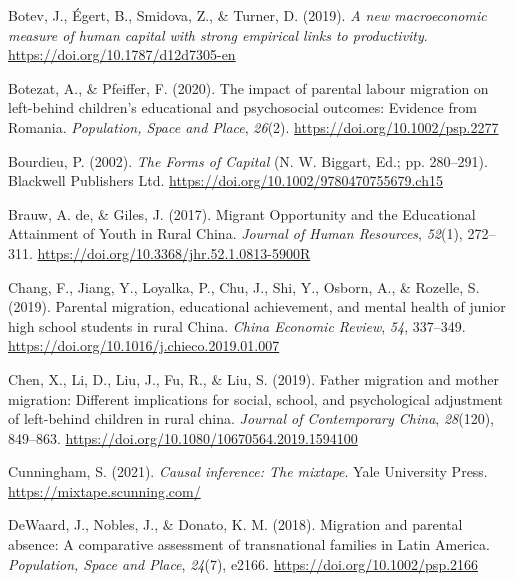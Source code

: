 \documentclass[
  man,floatsintext]{apa7}
\newlength{\cslhangindent}
\newlength{\cslentryspacingunit} %
\newenvironment{CSLReferences}[2] %
 {%
  \setlength{\parindent}{0pt}
  \ifodd #1
  \let\oldpar\par
  \def\par{\hangindent=\cslhangindent\oldpar}
  \fi
  \setlength{\parskip}{#2\cslentryspacingunit}
 }%
 {}
\begin{document}
\begin{CSLReferences}{1}{0}
\leavevmode{}%
Botev, J., Égert, B., Smidova, Z., \& Turner, D. (2019). \emph{A new macroeconomic measure of human capital with strong empirical links to productivity}. \url{https://doi.org/10.1787/d12d7305-en}

\leavevmode{}%
Botezat, A., \& Pfeiffer, F. (2020). The impact of parental labour migration on left{-}behind children's educational and psychosocial outcomes: Evidence from Romania. \emph{Population, Space and Place}, \emph{26}(2). \url{https://doi.org/10.1002/psp.2277}

\leavevmode{}%
Bourdieu, P. (2002). \emph{The Forms of Capital} (N. W. Biggart, Ed.; pp. 280--291). Blackwell Publishers Ltd. \url{https://doi.org/10.1002/9780470755679.ch15}

\leavevmode{}%
Brauw, A. de, \& Giles, J. (2017). Migrant Opportunity and the Educational Attainment of Youth in Rural China. \emph{Journal of Human Resources}, \emph{52}(1), 272--311. \url{https://doi.org/10.3368/jhr.52.1.0813-5900R}

\leavevmode{}%
Chang, F., Jiang, Y., Loyalka, P., Chu, J., Shi, Y., Osborn, A., \& Rozelle, S. (2019). Parental migration, educational achievement, and mental health of junior high school students in rural China. \emph{China Economic Review}, \emph{54}, 337--349. \url{https://doi.org/10.1016/j.chieco.2019.01.007}

\leavevmode{}%
Chen, X., Li, D., Liu, J., Fu, R., \& Liu, S. (2019). Father migration and mother migration: Different implications for social, school, and psychological adjustment of left-behind children in rural china. \emph{Journal of Contemporary China}, \emph{28}(120), 849--863. \url{https://doi.org/10.1080/10670564.2019.1594100}

\leavevmode{}%
Cunningham, S. (2021). \emph{Causal inference: The mixtape}. Yale University Press. \url{https://mixtape.scunning.com/}

\leavevmode{}%
DeWaard, J., Nobles, J., \& Donato, K. M. (2018). Migration and parental absence: A comparative assessment of transnational families in Latin America. \emph{Population, Space and Place}, \emph{24}(7), e2166. \url{https://doi.org/10.1002/psp.2166}


\end{CSLReferences}
\end{document}
